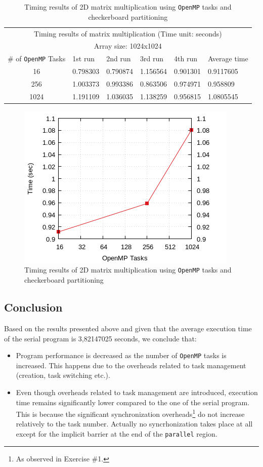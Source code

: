 \documentclass{article}
\def\code#1{\texttt{#1}}
\begin{document}
\begin{table}[htbp]
  \centering
    \begin{tabular}{|c||l|l|l|l||l|} 
    \hline
    \multicolumn{6}{|c|}{Timing results of matrix multiplication (Time unit: seconds)} \\
    \multicolumn{6}{|c|}{Array size: 1024x1024} \\
    \hline
   \# of \texttt{OpenMP} Tasks & 1st run & 2nd run & 3rd run & 4th run & Average time\\ [0.5ex] 
    \hline\hline
    16 & 0.798303 & 0.790874 & 1.156564 & 0.901301 & 0.9117605 \\ 
    \hline
    256 & 1.003373 & 0.993386 & 0.863506 & 0.974971 & 0.958809 \\
    \hline
    1024 & 1.191109 & 1.036035 & 1.138259 & 0.956815 & 1.0805545 \\ [1ex]
    \hline
    \end{tabular}
  \caption{Timing results of 2D matrix multiplication using \texttt{OpenMP}
           tasks and checkerboard partitioning}
\end{table}


\begin{figure}[htbp]
  \centering
  \includegraphics[width=0.55\columnwidth]{../ex3/plots/matmul.png}
  \caption{Timing results of 2D matrix multiplication using \texttt{OpenMP}
           tasks and checkerboard partitioning}
\end{figure}


\subsection{Conclusion}
Based on the results presented above and given that the average execution time of the serial
program is 3,82147025 seconds, we conclude that:

\begin{itemize}
 \item Program performance is decreased as the number of \texttt{OpenMP} tasks is increased.
       This happens due to the overheads related to task management (creation,
       task switching etc.).
 \item Even though overheads related to task management are introduced, execution time remains
       significantly lower compared to the one of the serial program. This is because
       the significant synchronization overheads\footnote{As observed in Exercise \#1.}
       do not increase relatively to the task number. Actually no syncrhonization takes 
       place at all except for the implicit barrier at the end of the \code{parallel}
       region.
\end{itemize}
\end{document}
